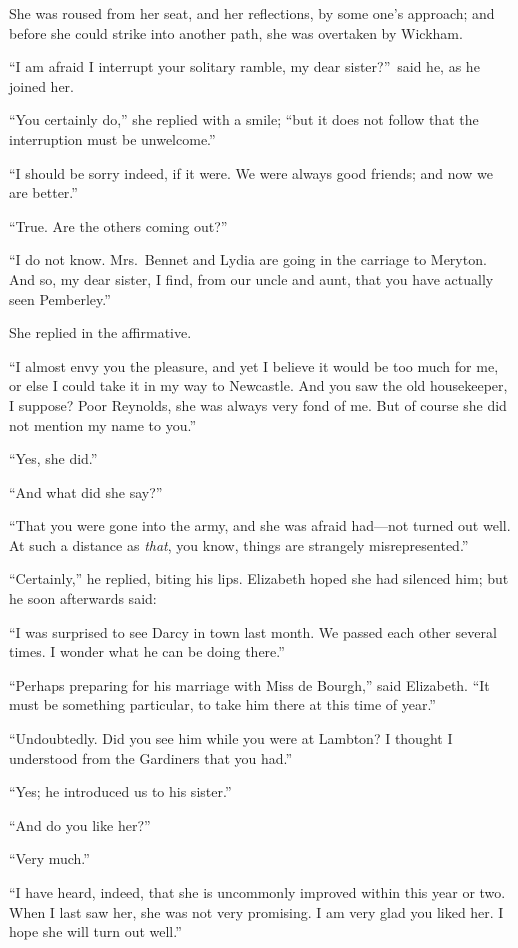 \documentclass[12pt,english]{book}
\begin{document}
She was roused from her seat, and her reflections, by some one's approach;
and before she could strike into another path, she was overtaken by
Wickham.

{}``I am afraid I interrupt your solitary ramble, my dear sister?''\ 
said he, as he joined her.

{}``You certainly do,'' she replied with a smile; {}``but it does
not follow that the interruption must be unwelcome.''

{}``I should be sorry indeed, if it were. We were always good friends;
and now we are better.''

{}``True. Are the others coming out?''\ 

{}``I do not know. Mrs.\ Bennet and Lydia are going in the carriage
to Meryton. And so, my dear sister, I find, from our uncle and aunt,
that you have actually seen Pemberley.''

She replied in the affirmative.

{}``I almost envy you the pleasure, and yet I believe it would be
too much for me, or else I could take it in my way to Newcastle. And
you saw the old housekeeper, I suppose? Poor Reynolds, she was always
very fond of me. But of course she did not mention my name to you.''

{}``Yes, she did.''

{}``And what did she say?''\ 

{}``That you were gone into the army, and she was afraid had\mbox{---}not
turned out well. At such a distance as \textit{that}, you know, things
are strangely misrepresented.''

{}``Certainly,'' he replied, biting his lips. Elizabeth hoped she
had silenced him; but he soon afterwards said:

{}``I was surprised to see Darcy in town last month. We passed each
other several times. I wonder what he can be doing there.''

{}``Perhaps preparing for his marriage with Miss de Bourgh,'' said
Elizabeth. {}``It must be something particular, to take him there
at this time of year.''

{}``Undoubtedly. Did you see him while you were at Lambton? I thought
I understood from the Gardiners that you had.''

{}``Yes; he introduced us to his sister.''

{}``And do you like her?''\ 

{}``Very much.''

{}``I have heard, indeed, that she is uncommonly improved within
this year or two. When I last saw her, she was not very promising.
I am very glad you liked her. I hope she will turn out well.''
\end{document}
